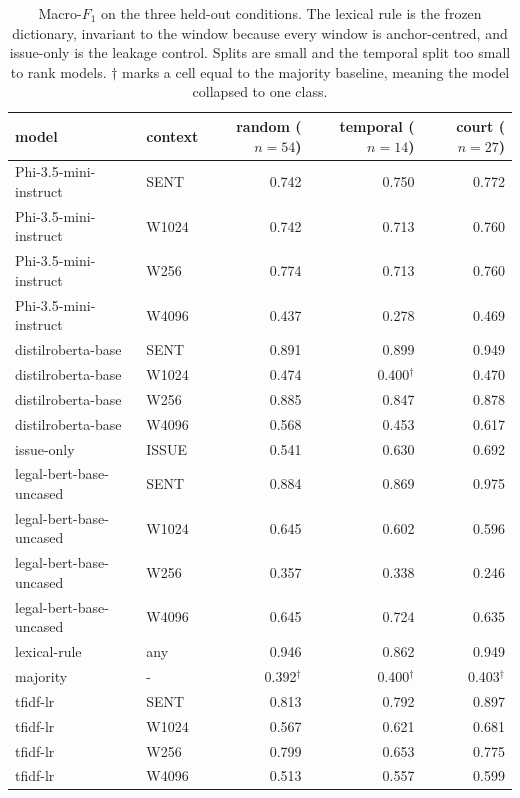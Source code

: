 \begin{table}[t]
\centering\footnotesize
\begin{tabular}{llrrr}
\toprule
model & context & random ($n{=}54$) & temporal ($n{=}14$) & court ($n{=}27$) \\
\midrule
Phi-3.5-mini-instruct & SENT & 0.742 & 0.750 & 0.772 \\
Phi-3.5-mini-instruct & W1024 & 0.742 & 0.713 & 0.760 \\
Phi-3.5-mini-instruct & W256 & 0.774 & 0.713 & 0.760 \\
Phi-3.5-mini-instruct & W4096 & 0.437 & 0.278 & 0.469 \\
distilroberta-base & SENT & 0.891 & 0.899 & 0.949 \\
distilroberta-base & W1024 & 0.474 & 0.400$^{\dagger}$ & 0.470 \\
distilroberta-base & W256 & 0.885 & 0.847 & 0.878 \\
distilroberta-base & W4096 & 0.568 & 0.453 & 0.617 \\
issue-only & ISSUE & 0.541 & 0.630 & 0.692 \\
legal-bert-base-uncased & SENT & 0.884 & 0.869 & 0.975 \\
legal-bert-base-uncased & W1024 & 0.645 & 0.602 & 0.596 \\
legal-bert-base-uncased & W256 & 0.357 & 0.338 & 0.246 \\
legal-bert-base-uncased & W4096 & 0.645 & 0.724 & 0.635 \\
lexical-rule & any & 0.946 & 0.862 & 0.949 \\
majority & - & 0.392$^{\dagger}$ & 0.400$^{\dagger}$ & 0.403$^{\dagger}$ \\
tfidf-lr & SENT & 0.813 & 0.792 & 0.897 \\
tfidf-lr & W1024 & 0.567 & 0.621 & 0.681 \\
tfidf-lr & W256 & 0.799 & 0.653 & 0.775 \\
tfidf-lr & W4096 & 0.513 & 0.557 & 0.599 \\
\bottomrule
\end{tabular}
\caption{Macro-$F_1$ on the three held-out conditions. The lexical rule is the frozen dictionary, invariant to the window because every window is anchor-centred, and issue-only is the leakage control. Splits are small and the temporal split too small to rank models. $\dagger$ marks a cell equal to the majority baseline, meaning the model collapsed to one class.}
\label{tab:models}
\end{table}
